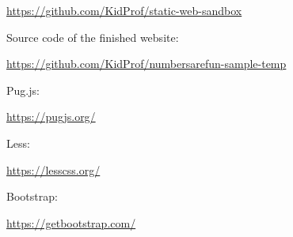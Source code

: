 \url{https://github.com/KidProf/static-web-sandbox}
\vspace{6mm}

Source code of the finished website:

\url{https://github.com/KidProf/numbersarefun-sample-temp}
\vspace{6mm}

Pug.js: 

\url{https://pugjs.org/}
\vspace{6mm}

Less: 

\url{https://lesscss.org/}
\vspace{6mm}

Bootstrap: 

\url{https://getbootstrap.com/}
\vspace{6mm}


